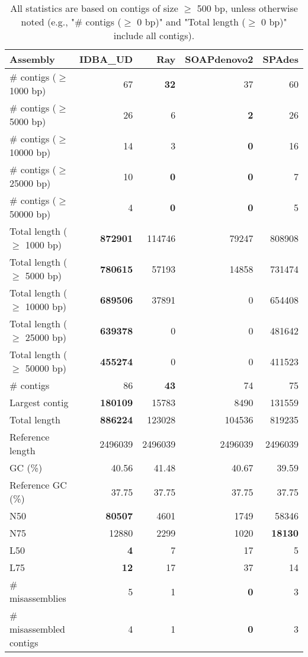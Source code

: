\documentclass[12pt,a4paper]{article}
\begin{document}
\begin{table}[ht]
\begin{center}
\caption{All statistics are based on contigs of size $\geq$ 500 bp, unless otherwise noted (e.g., "\# contigs ($\geq$ 0 bp)" and "Total length ($\geq$ 0 bp)" include all contigs).}
\begin{tabular}{|l*{4}{|r}|}
\hline
Assembly & IDBA\_UD & Ray & SOAPdenovo2 & SPAdes \\ \hline
\# contigs ($\geq$ 1000 bp) & 67 & {\bf 32} & 37 & 60 \\ \hline
\# contigs ($\geq$ 5000 bp) & 26 & 6 & {\bf 2} & 26 \\ \hline
\# contigs ($\geq$ 10000 bp) & 14 & 3 & {\bf 0} & 16 \\ \hline
\# contigs ($\geq$ 25000 bp) & 10 & {\bf 0} & {\bf 0} & 7 \\ \hline
\# contigs ($\geq$ 50000 bp) & 4 & {\bf 0} & {\bf 0} & 5 \\ \hline
Total length ($\geq$ 1000 bp) & {\bf 872901} & 114746 & 79247 & 808908 \\ \hline
Total length ($\geq$ 5000 bp) & {\bf 780615} & 57193 & 14858 & 731474 \\ \hline
Total length ($\geq$ 10000 bp) & {\bf 689506} & 37891 & 0 & 654408 \\ \hline
Total length ($\geq$ 25000 bp) & {\bf 639378} & 0 & 0 & 481642 \\ \hline
Total length ($\geq$ 50000 bp) & {\bf 455274} & 0 & 0 & 411523 \\ \hline
\# contigs & 86 & {\bf 43} & 74 & 75 \\ \hline
Largest contig & {\bf 180109} & 15783 & 8490 & 131559 \\ \hline
Total length & {\bf 886224} & 123028 & 104536 & 819235 \\ \hline
Reference length & 2496039 & 2496039 & 2496039 & 2496039 \\ \hline
GC (\%) & 40.56 & 41.48 & 40.67 & 39.59 \\ \hline
Reference GC (\%) & 37.75 & 37.75 & 37.75 & 37.75 \\ \hline
N50 & {\bf 80507} & 4601 & 1749 & 58346 \\ \hline
N75 & 12880 & 2299 & 1020 & {\bf 18130} \\ \hline
L50 & {\bf 4} & 7 & 17 & 5 \\ \hline
L75 & {\bf 12} & 17 & 37 & 14 \\ \hline
\# misassemblies & 5 & 1 & {\bf 0} & 3 \\ \hline
\# misassembled contigs & 4 & 1 & {\bf 0} & 3 \\ \hline

\end{tabular}
\end{center}
\end{table}
\end{document}
